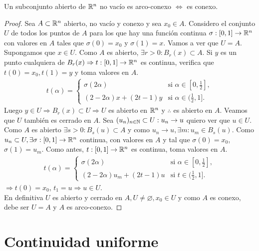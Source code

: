 \begin{theorem}
  Un subconjunto abierto de $\mathbb{R}^n$ no vacío es arco-conexo $\iff$ es conexo.

  \begin{proof}
    Sea $A \subset \mathbb{R}^n$ abierto, no vacío y conexo y sea $x_0 \in A$. Considero el conjunto $U$ de todos los puntos de $A$ para los que hay una función continua $\sigma: [0, 1] \to \mathbb{R}^n$ con valores en $A$ tales que $\sigma(0) = x_0$ y $\sigma(1) = x$. Vamos a ver que $U = A$. \\
    Supongamos que $x \in U$. Como $A$ es abierto, $\exists r > 0 : B_r(x) \subset A$. Si $y$ es un punto cualquiera de $B_r(x) \Rightarrow t: [0, 1] \to \mathbb{R}^n$ es continua, verifica que $t(0) = x_0, t(1) = y$ y toma valores en $A$.
    \begin{align*}
      t(\alpha) = \begin{cases}
        \sigma(2\alpha)           & \text{si } \alpha \in [0, \frac{1}{2}], \\
        (2 - 2 \alpha)x + (2t-1)y & \text{si } \alpha \in (\frac{1}{2}, 1].
      \end{cases}
    \end{align*} Luego $y \in U \Rightarrow B_r(x) \subset U \Rightarrow U$ es abierto en $\mathbb{R}^n$ y $\therefore$ es abierto en $A$. Veamos que $U$ también es cerrado en $A$. Sea $(u_n)_{n \in \mathbb{N}} \subset U : u_n \to u$ quiero ver que $u \in U$. Como $A$ es abierto $\exists s > 0 : B_s(u) \subset A$ y como $u_n \to u, \exists m : u_m \in B_s(u)$. Como $u_n \subset U, \exists \sigma: [0, 1] \to \mathbb{R}^n$ continua, con valores en $A$ y tal que $\sigma(0) = x_0$, $\sigma(1) = u_m$. Como antes, $t: [0, 1] \to \mathbb{R}^n$ es continua, toma valores en $A$.
    \begin{align*} t(\alpha) = \begin{cases}
        \sigma(2\alpha)                & \text{si } \alpha \in [0, \frac{1}{2}], \\
        (2 - 2\alpha) u_m + (2t - 1) u & \text{si } t \in (\frac{1}{2}, 1].
      \end{cases}
    \end{align*}$\Rightarrow t(0) = x_0$, $t_1 = u \Rightarrow u \in U$. \\
    En definitiva $U$ es abierto y cerrado en $A, U \neq \varnothing, x_0 \in U$ y como $A$ es conexo, debe ser $U = A$ y $A$ es arco-conexo.
  \end{proof}
\end{theorem}

\section{Continuidad uniforme}

